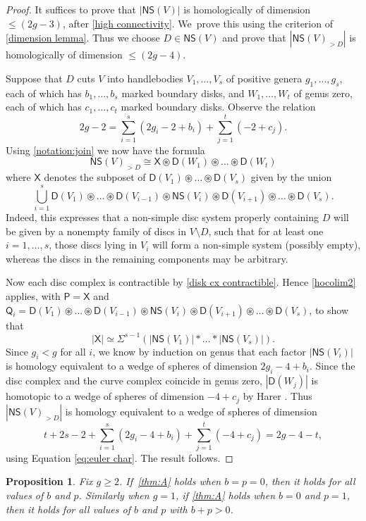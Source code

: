 \documentclass[11pt]{article}
\theoremstyle{plain}
\newtheorem{prop}[thm]{Proposition}
\theoremstyle{definition}
\let\altjoin\circledast
\newcommand{\NS}{\mathsf{NS}}
\newcommand{\D}{\mathsf{D}}
\begin{document}
\begin{proof}It suffices to prove that $|\NS(V)|$ is homologically of dimension~$\leq (2g-3)$, after \cref{high connectivity}. We~prove this using the criterion of \cref{dimension lemma}. Thus we choose $D \in \NS(V)$ and prove that $|\NS(V)_{>D}|$ is homologically of dimension $\leq (2g-4)$.

Suppose that $D$ cuts $V$ into handlebodies $V_1,\dots,V_{s}$ of positive genera $g_1,\dots,g_s$, each of which has $b_1,\dots,b_s$ marked boundary disks, and $W_1,\dots,W_t$ of genus zero, each of which has $c_1,\dots,c_t$ marked boundary disks. Observe the relation
\begin{equation}\tag{$\star$}\label{eq:euler char}
2g-2 = \sum_{i=1}^s (2g_i - 2 + b_i) + \sum_{j=1}^t (-2+c_j).
\end{equation}
Using \cref{notation:join} we now have the formula
\[
\NS(V)_{>D} \cong \mathsf X \altjoin \D(W_1) \altjoin \dots \altjoin \D(W_t)
\]
where $\mathsf X$ denotes the subposet of $\D(V_1) \altjoin \dots \altjoin \D(V_s)$ given by the union
\[
\bigcup_{i=1}^s \D(V_1) \altjoin \dots \altjoin \D(V_{i-1}) \altjoin \NS(V_i) \altjoin \D(V_{i+1}) \altjoin \dots \altjoin \D(V_s).
\]Indeed, this expresses that a non-simple disc system properly containing $D$ will be given by a nonempty family of discs in $V \setminus D$, such that for at least one $i=1,\dots,s$, those discs lying in $V_i$ will form a non-simple system (possibly empty), whereas the discs in the remaining components may be arbitrary.

Now each disc complex is contractible by \cref{disk cx contractible}. Hence \cref{hocolim2} applies, with $\mathsf P = \mathsf X$ and $\mathsf Q_i = \D(V_1) \altjoin \dots \altjoin \D(V_{i-1}) \altjoin \NS(V_i) \altjoin \D(V_{i+1}) \altjoin \dots \altjoin \D(V_s)$, to show that
\[
|\mathsf X| \simeq \Sigma^{s-1} (|\NS(V_1)| \ast \dots \ast |\NS(V_s)|) .
\]
Since $g_i<g$ for all $i$, we know by induction on genus that each factor $|\NS(V_i)|$ is homology equivalent to a wedge of spheres of dimension $2g_i-4+b_i$. Since the disc complex and the curve complex coincide in genus zero, $|\D(W_j)|$ is homotopic to a wedge of spheres of dimension $-4+c_j$ by Harer \cite{harer}. Thus $|\NS(V)_{>D}|$ is homology equivalent to a wedge of spheres of dimension
\[
t+ 2s-2+ \sum_{i=1}^s (2g_i-4+b_i) + \sum_{j=1}^t (-4+c_j) = 2g-4-t,
\]
using Equation \eqref{eq:euler char}. The result follows. \end{proof}

\begin{prop}\label{birman trick} Fix $g \geq 2$. If~\cref{thm:A} holds when $b=p=0$, then it holds for all values of $b$ and $p$. Similarly when $g=1$, if \cref{thm:A} holds when $b=0$ and $p=1$, then it holds for all values of $b$ and $p$ with $b+p>0$.
\end{prop}
\end{document}
